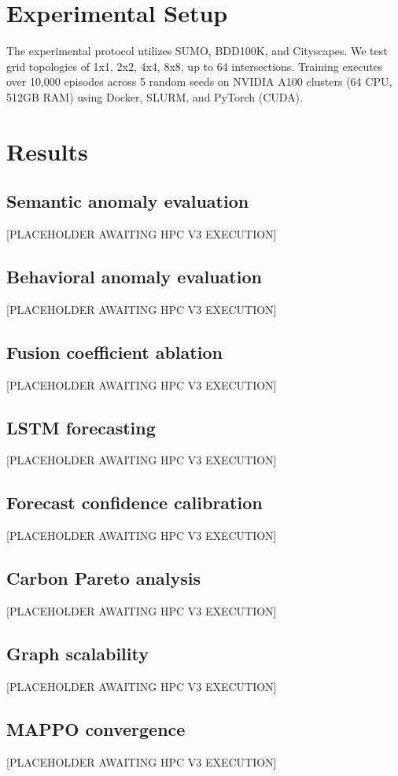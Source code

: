 \documentclass[journal]{IEEEtran}
\begin{document}
\section{Experimental Setup}
\label{sec:experimental_setup}
The experimental protocol utilizes SUMO, BDD100K, and Cityscapes. We test grid topologies of 1x1, 2x2, 4x4, 8x8, up to 64 intersections. Training executes over 10,000 episodes across 5 random seeds on NVIDIA A100 clusters (64 CPU, 512GB RAM) using Docker, SLURM, and PyTorch (CUDA).

\section{Results}
\label{sec:results}
\subsection{Semantic anomaly evaluation}
[PLACEHOLDER AWAITING HPC V3 EXECUTION]
\subsection{Behavioral anomaly evaluation}
[PLACEHOLDER AWAITING HPC V3 EXECUTION]
\subsection{Fusion coefficient ablation}
[PLACEHOLDER AWAITING HPC V3 EXECUTION]
\subsection{LSTM forecasting}
[PLACEHOLDER AWAITING HPC V3 EXECUTION]
\subsection{Forecast confidence calibration}
[PLACEHOLDER AWAITING HPC V3 EXECUTION]
\subsection{Carbon Pareto analysis}
[PLACEHOLDER AWAITING HPC V3 EXECUTION]
\subsection{Graph scalability}
[PLACEHOLDER AWAITING HPC V3 EXECUTION]
\subsection{MAPPO convergence}
[PLACEHOLDER AWAITING HPC V3 EXECUTION]
\end{document}

